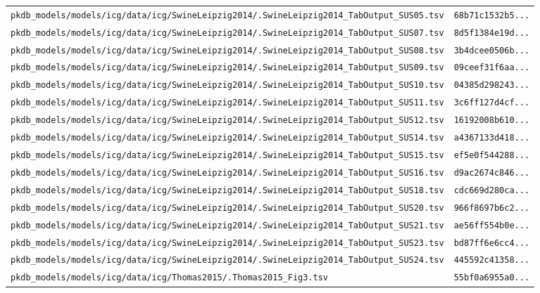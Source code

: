 \begin{longtable}{ll}
\texttt{pkdb\_models/models/icg/data/icg/SwineLeipzig2014/.SwineLeipzig2014\_TabOutput\_SUS05.tsv} & \texttt{68b71c1532b5...} \\
\texttt{pkdb\_models/models/icg/data/icg/SwineLeipzig2014/.SwineLeipzig2014\_TabOutput\_SUS07.tsv} & \texttt{8d5f1384e19d...} \\
\texttt{pkdb\_models/models/icg/data/icg/SwineLeipzig2014/.SwineLeipzig2014\_TabOutput\_SUS08.tsv} & \texttt{3b4dcee0506b...} \\
\texttt{pkdb\_models/models/icg/data/icg/SwineLeipzig2014/.SwineLeipzig2014\_TabOutput\_SUS09.tsv} & \texttt{09ceef31f6aa...} \\
\texttt{pkdb\_models/models/icg/data/icg/SwineLeipzig2014/.SwineLeipzig2014\_TabOutput\_SUS10.tsv} & \texttt{04385d298243...} \\
\texttt{pkdb\_models/models/icg/data/icg/SwineLeipzig2014/.SwineLeipzig2014\_TabOutput\_SUS11.tsv} & \texttt{3c6ff127d4cf...} \\
\texttt{pkdb\_models/models/icg/data/icg/SwineLeipzig2014/.SwineLeipzig2014\_TabOutput\_SUS12.tsv} & \texttt{16192008b610...} \\
\texttt{pkdb\_models/models/icg/data/icg/SwineLeipzig2014/.SwineLeipzig2014\_TabOutput\_SUS14.tsv} & \texttt{a4367133d418...} \\
\texttt{pkdb\_models/models/icg/data/icg/SwineLeipzig2014/.SwineLeipzig2014\_TabOutput\_SUS15.tsv} & \texttt{ef5e0f544288...} \\
\texttt{pkdb\_models/models/icg/data/icg/SwineLeipzig2014/.SwineLeipzig2014\_TabOutput\_SUS16.tsv} & \texttt{d9ac2674c846...} \\
\texttt{pkdb\_models/models/icg/data/icg/SwineLeipzig2014/.SwineLeipzig2014\_TabOutput\_SUS18.tsv} & \texttt{cdc669d280ca...} \\
\texttt{pkdb\_models/models/icg/data/icg/SwineLeipzig2014/.SwineLeipzig2014\_TabOutput\_SUS20.tsv} & \texttt{966f8697b6c2...} \\
\texttt{pkdb\_models/models/icg/data/icg/SwineLeipzig2014/.SwineLeipzig2014\_TabOutput\_SUS21.tsv} & \texttt{ae56ff554b0e...} \\
\texttt{pkdb\_models/models/icg/data/icg/SwineLeipzig2014/.SwineLeipzig2014\_TabOutput\_SUS23.tsv} & \texttt{bd87ff6e6cc4...} \\
\texttt{pkdb\_models/models/icg/data/icg/SwineLeipzig2014/.SwineLeipzig2014\_TabOutput\_SUS24.tsv} & \texttt{445592c41358...} \\
\texttt{pkdb\_models/models/icg/data/icg/Thomas2015/.Thomas2015\_Fig3.tsv} & \texttt{55bf0a6955a0...} \\

\end{longtable}
